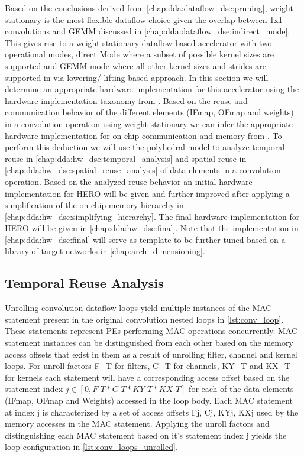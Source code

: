 Based on the conclusions derived from \autoref{chap:dda:dataflow_dse:pruning},
weight stationary is the most flexible dataflow choice given the overlap between
1x1 convolutions and GEMM discussed in
\autoref{chap:dda:dataflow_dse:indirect_mode}. This gives rise to a weight
stationary dataflow based accelerator
with two
operational modes, direct Mode where a subset of possible kernel sizes are
supported and GEMM mode where all other kernel sizes and strides are supported
in via lowering/ lifting based approach. In this section we will determine an
appropriate hardware implementation for this accelerator using the hardware
implementation taxonomy from \cite{maestro}. Based on the reuse and
communication behavior of the different elements (IFmap, OFmap and weights) in a
convolution operation using weight stationary we can infer the appropriate
hardware implementation for on-chip communication and memory from
\cite{maestro}. To perform this deduction we will use the polyhedral model to
analyze temporal reuse in \autoref{chap:dda:hw_dse:temporal_analysis} and
spatial reuse in \autoref{chap:dda:hw_dse:spatial_reuse_analysis} of data
elements in a convolution operation. Based on the
analyzed reuse behavior an initial hardware implementation for HERO will be
given and further improved after applying a simplification of the on-chip memory
hierarchy in \autoref{chap:dda:hw_dse:simplifying_hierarchy}. The final hardware
implementation for HERO will be given in \autoref{chap:dda:hw_dse:final}. Note
that the implementation in \autoref{chap:dda:hw_dse:final} will serve as
template to be further tuned based on a library of target networks in
\autoref{chap:arch_dimensioning}.  

\subsection{Temporal Reuse Analysis}
\label{chap:dda:hw_dse:temporal_analysis}

Unrolling convolution dataflow loops yield multiple instances of the \ac{MAC}
statement present in the original convolution nested loops in
\autoref{lst:conv_loop}. These statements represent \ac{PE}s performing MAC
operations concurrently. 
\ac{MAC} statement instances can be distinguished from each other based on the memory access offsets that
exist in them as a result of unrolling filter, channel and kernel loops. For
unroll factors F\_T for filters, C\_T for channels, KY\_T and KX\_T for kernels
each statement will have a corresponding access offset based on the statement
index $j \in [0, F\_T*C\_T*KY\_T*KX\_T]$ for each of the data elements
(IFmap, OFmap and Weights) accessed in the loop body. Each \ac{MAC} statement
at index j is characterized by a set of access offsets {Fj, Cj, KYj,
KXj} used by the memory accesses in the \ac{MAC} statement. Applying the unroll
factors and distinguishing each \ac{MAC} statement based on it's statement index
j yields the loop configuration in \autoref{lst:conv_loops_unrolled}. 

